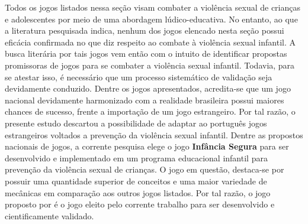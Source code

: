 Todos os jogos listados nessa seção visam combater a violência sexual de crianças e adolescentes por meio de uma abordagem lúdico-educativa. No entanto, ao que a literatura pesquisada indica, nenhum dos jogos elencado nesta seção possui eficácia confirmada no que diz respeito ao combate à violência sexual infantil. A busca literária por tais jogos vem então com o intuito de identificar propostas promissoras de jogos para se combater a violência sexual infantil. Todavia, para se atestar isso, é necessário que um processo sistemático de validação seja devidamente conduzido. Dentre os jogos apresentados, acredita-se que um jogo nacional devidamente harmonizado com a realidade brasileira possui maiores chances de sucesso, frente a importação de um jogo estrangeiro. Por tal razão, o presente estudo descartou a possibilidade de adaptar ao português jogos estrangeiros voltados a prevenção da violência sexual infantil. Dentre as propostos nacionais de jogos, a corrente pesquisa elege o jogo \textbf{Infância Segura} para ser desenvolvido e implementado em um programa educacional infantil para prevenção da violência sexual de crianças. O jogo em questão, destaca-se por possuir uma quantidade superior de conceitos e uma maior variedade de mecânicas em comparação aos outros jogos listados. Por tal razão, o jogo proposto por  é o jogo eleito pelo corrente trabalho para ser desenvolvido e cientificamente validado.